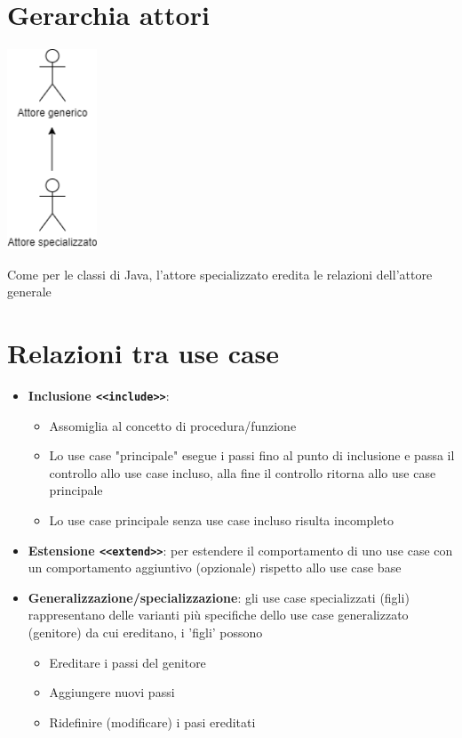 \documentclass[12pt, a4paper]{report}
\begin{document}
\section{Gerarchia attori}
\begin{center}
    \includegraphics[width=0.2\textwidth]{Immagini/attori.png}
\end{center}
Come per le classi di Java, l'attore specializzato eredita le relazioni dell'attore generale
\section{Relazioni tra use case}
\begin{itemize}
    \item \textbf{Inclusione \texttt{<<include>>}}: \begin{itemize}
        \item Assomiglia al concetto di procedura/funzione
        \item Lo use case "principale" esegue i passi fino al punto di inclusione e passa il controllo allo use case incluso, alla fine il controllo ritorna allo use case principale
        \item Lo use case principale senza use case incluso risulta incompleto
    \end{itemize}
    \item \textbf{Estensione \texttt{<<extend>>}}: per estendere il comportamento di uno use case con un comportamento aggiuntivo (opzionale) rispetto allo use case base
    \item \textbf{Generalizzazione/specializzazione}: gli use case specializzati (figli) rappresentano delle varianti più specifiche dello use case generalizzato (genitore) da cui ereditano, i 'figli' possono \begin{itemize}
        \item Ereditare i passi del genitore
        \item Aggiungere nuovi passi
        \item Ridefinire (modificare) i pasi ereditati
    \end{itemize}
\end{itemize}
\end{document}
